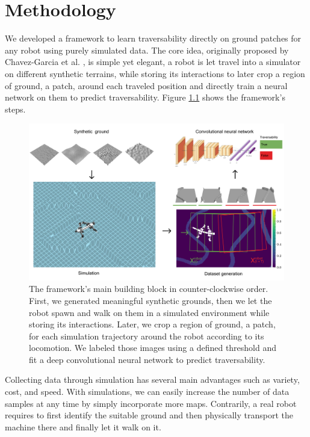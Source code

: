 \documentclass[../document.tex]{subfiles}
\begin{document}
\chapter{Methodology}
\label{chap: methodology}
We developed a framework to learn traversability directly on ground patches for any robot using purely simulated data. The core idea, originally proposed by Chavez-Garcia et al. \cite{omar2018traversability}, is simple yet elegant, a robot is let travel into a simulator on different synthetic terrains, while storing its interactions to later crop a region of ground, a patch, around each traveled position and directly train a neural network on them to predict traversability. Figure \ref{fig : pipeline} shows the framework's steps.

\begin{figure}[H]
    \centering
        \includegraphics[width=\textwidth]{../img/method.png}
    \caption{The framework's main building block in counter-clockwise order. First, we generated meaningful synthetic grounds, then we let the robot spawn and walk on them in a simulated environment while storing its interactions. Later, we crop a region of ground, a patch, for each simulation trajectory around the robot according to its locomotion. We labeled those images using a defined threshold and fit a deep convolutional neural network to predict traversability. }
    \label{fig : pipeline}
    \end{figure}
Collecting data through simulation has several main advantages such as variety, cost, and speed. With simulations, we can easily increase the number of data samples at any time by simply incorporate more maps. Contrarily, a real robot requires to first identify the suitable ground and then physically transport the machine there and finally let it walk on it.
\end{document}
